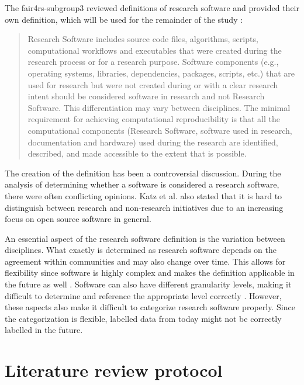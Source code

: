 The \acrfull{fair4rs}-subgroup3 reviewed definitions of research software and provided their own definition, which will be used for the remainder of the study \cite{gruenpeter_defining_2021}:
\begin{quote}
\begin{definition}
Research Software includes source code files, algorithms, scripts, computational workflows and executables that were created during the research process or for a research purpose. Software components (e.g., operating systems, libraries, dependencies, packages, scripts, etc.) that are used for research but were not created during or with a clear research intent should be considered software in research and not Research Software. This differentiation may vary between disciplines. The minimal requirement for achieving computational reproducibility is that all the computational components (Research Software, software used in research, documentation and hardware) used during the research are identified, described, and made accessible to the extent that is possible. \cite{gruenpeter_defining_2021}
\end{definition}
\end{quote}
The creation of the definition has been a controversial discussion. During the analysis of determining whether a software is considered a research software, there were often conflicting opinions. Katz et al. \cite{katz_research_2020} also stated that it is hard to distinguish between research and non-research initiatives due to an increasing focus on open source software in general.

An essential aspect of the research software definition is the variation between disciplines. What exactly is determined as research software depends on the agreement within communities and may also change over time. This allows for flexibility since software is highly complex and makes the definition applicable in the future as well \cite{lamprecht_towards_2020}. Software can also have different granularity levels, making it difficult to determine and reference the appropriate level correctly \cite{research_data_allianceforce11_software_source_code_identification_wg_use_2020}. However, these aspects also make it difficult to categorize research software properly. Since the categorization is flexible, labelled data from today might not be correctly labelled in the future.



\section{Literature review protocol}
\label{sec:lit_protocol}

